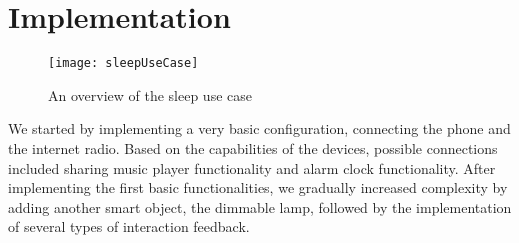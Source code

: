 





\section{Implementation}

  
\begin{figure}
\centering
\texttt{[image: sleepUseCase]}
\caption{An overview of the sleep use case}
\label{sleep}
\end{figure}


We started by implementing a very basic configuration, connecting the phone and the internet radio. Based on the capabilities of the devices, possible connections included sharing music player functionality and alarm clock functionality. After implementing the first basic functionalities, we gradually increased complexity by adding another smart object, the dimmable lamp, followed by the implementation of several types of interaction feedback.



